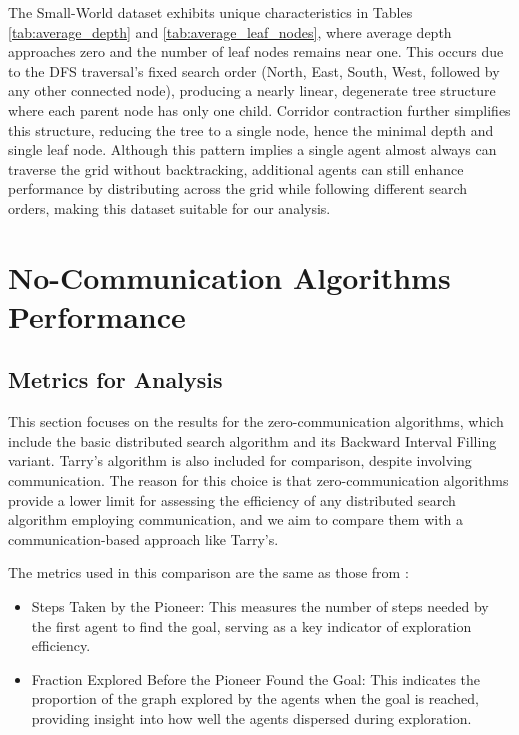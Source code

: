 The Small-World dataset exhibits unique characteristics in Tables \ref{tab:average_depth} and \ref{tab:average_leaf_nodes}, where average depth approaches zero and the number of leaf nodes remains near one. This occurs due to the DFS traversal's fixed search order (North, East, South, West, followed by any other connected node), producing a nearly linear, degenerate tree structure where each parent node has only one child. Corridor contraction further simplifies this structure, reducing the tree to a single node, hence the minimal depth and single leaf node. Although this pattern implies a single agent almost always can traverse the grid without backtracking, additional agents can still enhance performance by distributing across the grid while following different search orders, making this dataset suitable for our analysis.


\section{No-Communication Algorithms Performance}
\label{section_result_no_comm}

\subsection{Metrics for Analysis}
\label{subsection_no_comm_metrics}

This section focuses on the results for the zero-communication algorithms, which include the basic distributed search algorithm and its Backward Interval Filling variant. Tarry's algorithm is also included for comparison, despite involving communication. The reason for this choice is that zero-communication algorithms provide a lower limit for assessing the efficiency of any distributed search algorithm employing communication, and we aim to compare them with a communication-based approach like Tarry's.


The metrics used in this comparison are the same as those from :

\begin{itemize}
    \item Steps Taken by the Pioneer: This measures the number of steps needed by the first agent to find the goal, serving as a key indicator of exploration efficiency.
    \item Fraction Explored Before the Pioneer Found the Goal: This indicates the proportion of the graph explored by the agents when the goal is reached, providing insight into how well the agents dispersed during exploration.
\end{itemize}
    
